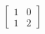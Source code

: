\documentclass[preview]{standalone}
\begin{document}
\begin{align*}
\begin{bmatrix} 1 & 0 \\ 1 & 2 \end{bmatrix}
\end{align*}
\end{document}

